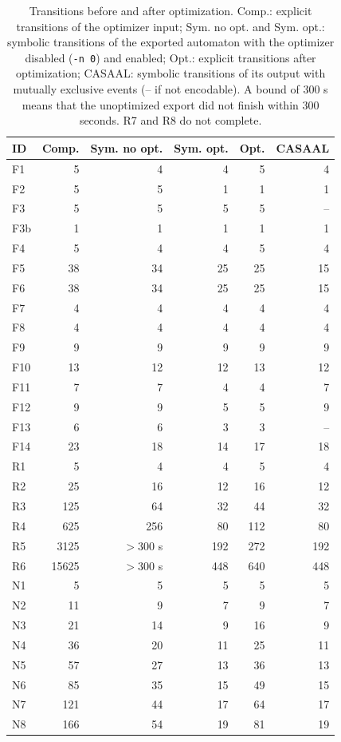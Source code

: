 \begin{table}[t]
\centering
\caption{Transitions before and after optimization. Comp.: explicit transitions of the optimizer input; Sym. no opt. and Sym. opt.: symbolic transitions of the exported automaton with the optimizer disabled (\texttt{-n 0}) and enabled; Opt.: explicit transitions after optimization; CASAAL: symbolic transitions of its output with mutually exclusive events (-- if not encodable). A bound of 300 s means that the unoptimized export did not finish within 300 seconds. R7 and R8 do not complete.}
\label{tab:symbolic-before-after}
\scriptsize
\setlength{\tabcolsep}{4pt}
\begin{tabular}{@{}lrrrrr@{}}
\toprule
ID & Comp. & Sym. no opt. & Sym. opt. & Opt. & CASAAL\\
\midrule
F1 & 5 & 4 & 4 & 5 & 4\\
F2 & 5 & 5 & 1 & 1 & 1\\
F3 & 5 & 5 & 5 & 5 & --\\
F3b & 1 & 1 & 1 & 1 & 1\\
F4 & 5 & 4 & 4 & 5 & 4\\
F5 & 38 & 34 & 25 & 25 & 15\\
F6 & 38 & 34 & 25 & 25 & 15\\
F7 & 4 & 4 & 4 & 4 & 4\\
F8 & 4 & 4 & 4 & 4 & 4\\
F9 & 9 & 9 & 9 & 9 & 9\\
F10 & 13 & 12 & 12 & 13 & 12\\
F11 & 7 & 7 & 4 & 4 & 7\\
F12 & 9 & 9 & 5 & 5 & 9\\
F13 & 6 & 6 & 3 & 3 & --\\
F14 & 23 & 18 & 14 & 17 & 18\\
R1 & 5 & 4 & 4 & 5 & 4\\
R2 & 25 & 16 & 12 & 16 & 12\\
R3 & 125 & 64 & 32 & 44 & 32\\
R4 & 625 & 256 & 80 & 112 & 80\\
R5 & 3125 & $>$300 s & 192 & 272 & 192\\
R6 & 15625 & $>$300 s & 448 & 640 & 448\\
N1 & 5 & 5 & 5 & 5 & 5\\
N2 & 11 & 9 & 7 & 9 & 7\\
N3 & 21 & 14 & 9 & 16 & 9\\
N4 & 36 & 20 & 11 & 25 & 11\\
N5 & 57 & 27 & 13 & 36 & 13\\
N6 & 85 & 35 & 15 & 49 & 15\\
N7 & 121 & 44 & 17 & 64 & 17\\
N8 & 166 & 54 & 19 & 81 & 19\\
\bottomrule
\end{tabular}
\end{table}
